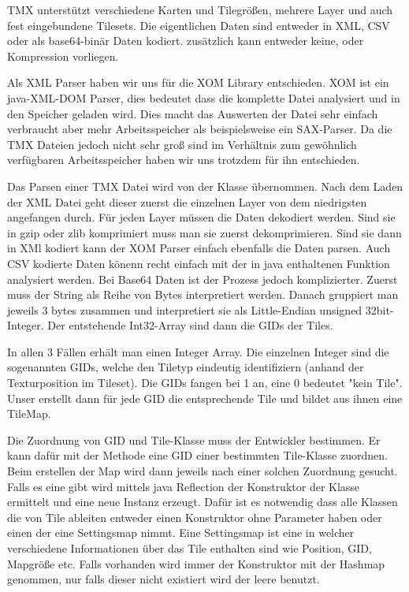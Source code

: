 TMX unterstützt verschiedene Karten und Tilegrößen, mehrere Layer und auch fest eingebundene Tilesets. Die eigentlichen Daten sind entweder in XML, CSV oder als base64-binär Daten kodiert. zusätzlich kann entweder keine,  oder  Kompression vorliegen\cite{TMXDOC}.

Als XML Parser haben wir uns für die XOM Library entschieden. XOM ist ein java-XML-DOM Parser, dies bedeutet dass die komplette Datei analysiert und in den Speicher geladen wird. Dies macht das Auswerten der Datei sehr einfach verbraucht aber mehr Arbeitsspeicher als beispielsweise ein SAX-Parser. Da die TMX Dateien jedoch nicht sehr groß sind im Verhältnis zum gewöhnlich verfügbaren Arbeitsspeicher haben wir uns trotzdem für ihn entschieden.

Das Parsen einer TMX Datei wird von der Klasse  übernommen. Nach dem Laden der XML Datei geht dieser zuerst die einzelnen Layer von dem niedrigsten angefangen durch. Für jeden Layer müssen die Daten dekodiert werden. Sind sie in gzip oder zlib komprimiert muss man sie zuerst dekomprimieren. Sind sie dann in XMl kodiert kann der XOM Parser einfach ebenfalls die Daten parsen. Auch CSV kodierte Daten könenn recht einfach mit der in java enthaltenen  Funktion analysiert werden.
Bei Base64 Daten ist der Prozess jedoch komplizierter. Zuerst muss der String als Reihe von Bytes interpretiert werden. Danach gruppiert man jeweils 3 bytes zusammen und interpretiert sie als Little-Endian unsigned 32bit-Integer. Der entstehende Int32-Array sind dann die GIDs der Tiles.

In allen 3 Fällen erhält man einen Integer Array. Die einzelnen Integer sind die sogenannten GIDs, welche den Tiletyp eindeutig identifiziern (anhand der Texturposition im Tileset).
Die GIDs fangen bei 1 an, eine 0 bedeutet "kein Tile". Unser  erstellt dann für jede GID die entsprechende Tile und bildet aus ihnen eine TileMap.

Die Zuordnung von GID und Tile-Klasse muss der Entwickler bestimmen. Er kann dafür mit der Methode  eine GID einer bestimmten Tile-Klasse zuordnen. Beim erstellen der Map wird dann jeweils nach einer solchen Zuordnung gesucht. Falls es eine gibt wird mittels java Reflection der Konstruktor der Klasse ermittelt und eine neue Instanz erzeugt. Dafür ist es notwendig dass alle Klassen die von Tile ableiten entweder einen Konstruktor ohne Parameter haben oder einen der eine Settingsmap nimmt. Eine Settingsmap ist eine  in welcher verschiedene Informationen über das Tile enthalten sind wie Position, GID, Mapgröße etc. Falls vorhanden wird immer der Konstruktor mit der Hashmap genommen, nur falls dieser nicht existiert wird der leere benutzt.

